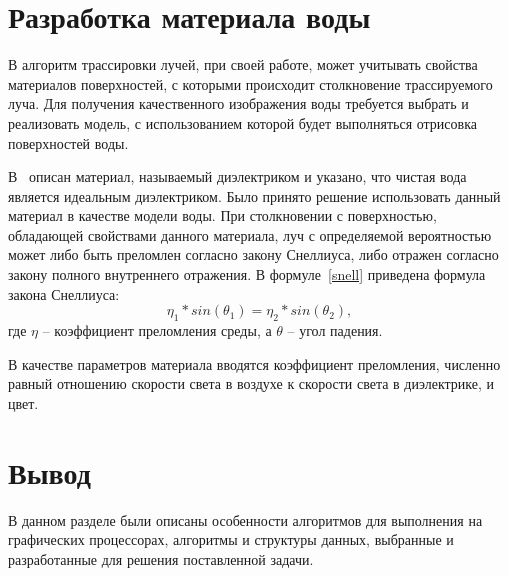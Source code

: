 \section{Разработка материала воды}

В алгоритм трассировки лучей, при своей работе, может учитывать 
свойства материалов поверхностей, с которыми происходит столкновение 
трассируемого луча. Для получения качественного изображения воды требуется выбрать 
и реализовать модель, с использованием которой будет выполняться отрисовка 
поверхностей воды.

В~\cite{RTW} описан материал, называемый диэлектриком и указано, что
чистая вода является идеальным диэлектриком. Было принято решение использовать
данный материал в качестве модели воды. При столкновении с поверхностью, обладающей
свойствами данного материала, луч с определяемой вероятностью может
либо быть преломлен согласно закону Снеллиуса, либо отражен согласно закону 
полного внутреннего отражения. В формуле~\ref{snell} приведена формула закона
Снеллиуса:
\begin{equation}
    \label{snell}
    \eta_1 * sin(\theta_1) = \eta_2 * sin(\theta_2),
\end{equation}
где $\eta$ -- коэффициент преломления среды, а $\theta$ -- угол падения. 

В качестве параметров материала вводятся коэффициент преломления, численно равный 
отношению скорости света в воздухе к скорости света в диэлектрике, и цвет. 

\section*{Вывод}

В данном разделе были описаны особенности алгоритмов для выполнения
на графических процессорах, алгоритмы и структуры данных, выбранные 
и разработанные для решения поставленной задачи. 
